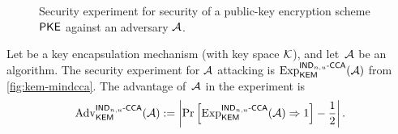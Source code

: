 \begin{figure}[h]
	\centering
	\caption{Security experiment for \MINDCPA security of a public-key encryption scheme $\PKE$ against an adversary $\Adversary$.}%
	\label{fig:pke-mindcpa}
\end{figure}

\begin{definition}%
  \label{def:MIND-CCA}
  Let \KEM be a key encapsulation mechanism (with key space $\KeySp$), and let~$\Adversary$ be an algorithm.
  The \MINDCCA security experiment for $\Adversary$ attacking \KEM is $\Exp{\MINDCCA}{\KEM}(\Adversary)$ from \autoref{fig:kem-mindcca}.
  The advantage of~$\Adversary$ in the experiment is
 \[ \Adv{\MINDCCA}{\KEM}(\Adversary) := \left| \Pr\left[ \Exp{\MINDCCA}{\KEM}(\Adversary) \Rightarrow 1 \right] - \frac{1}{2} \right| . \]
\end{definition}

